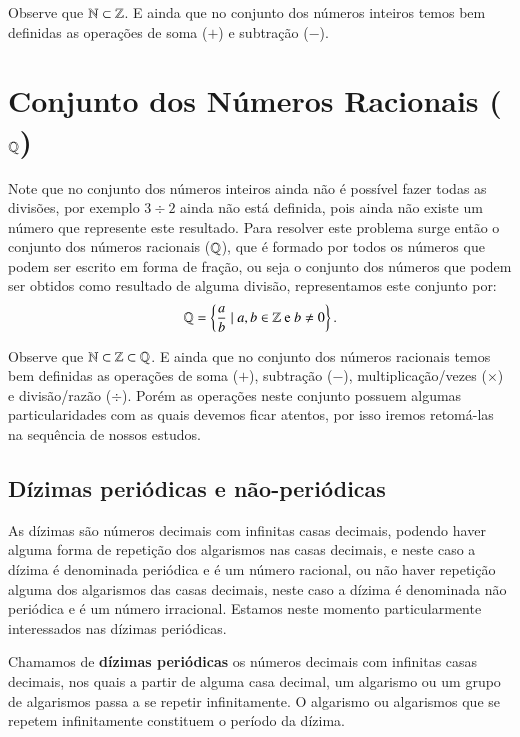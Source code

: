 Observe que $\mathbb{N} \subset \mathbb{Z}$. E ainda que no conjunto dos números inteiros temos bem definidas as operações de soma ($+$) e subtração ($-$).

\section{Conjunto dos Números Racionais (\texorpdfstring{$\mathbb{Q}$}{Q})}

Note que no conjunto dos números inteiros ainda não é possível fazer todas as divisões, por exemplo $3 \div 2$ ainda não está definida, pois ainda não existe um número que represente este resultado. Para resolver este problema surge então o conjunto dos números racionais ($\mathbb{Q}$), que é formado por todos os números que podem ser escrito em forma de fração, ou seja o conjunto dos números que podem ser obtidos como resultado de alguma divisão, representamos este conjunto por:
\[\mathbb{Q}= \left\{ \frac{a}{b} \mid a, b \in \mathbb{Z} \text{ e } b \neq 0 \right\}.\]

Observe que $\mathbb{N} \subset \mathbb{Z} \subset \mathbb{Q}$. E ainda que no conjunto dos números racionais temos bem definidas as operações de soma ($+$), subtração ($-$), multiplicação/vezes ($\times$) e divisão/razão ($\div$). Porém as operações neste conjunto possuem algumas particularidades com as quais devemos ficar atentos, por isso iremos retomá-las na sequência de nossos estudos.

\subsection{Dízimas periódicas e não-periódicas}
As dízimas são números decimais com infinitas casas decimais, podendo haver alguma forma de repetição dos algarismos nas casas decimais, e neste caso a dízima é denominada periódica e é um número racional, ou não haver repetição alguma dos algarismos das casas decimais, neste caso a dízima é denominada não periódica e é um número irracional. Estamos neste momento particularmente interessados nas dízimas periódicas.

 \vskip0.3cm
 \colorbox{azul}{
 \begin{minipage}{0.9\linewidth}
 \begin{center}
  Chamamos de \textbf{dízimas periódicas} os números decimais com infinitas casas decimais, nos quais a partir de alguma casa decimal, um algarismo ou um grupo de algarismos passa a se repetir infinitamente. O algarismo ou algarismos que se repetem infinitamente constituem o período da dízima.
 \end{center}
 \end{minipage}}
 \vskip0.3cm

